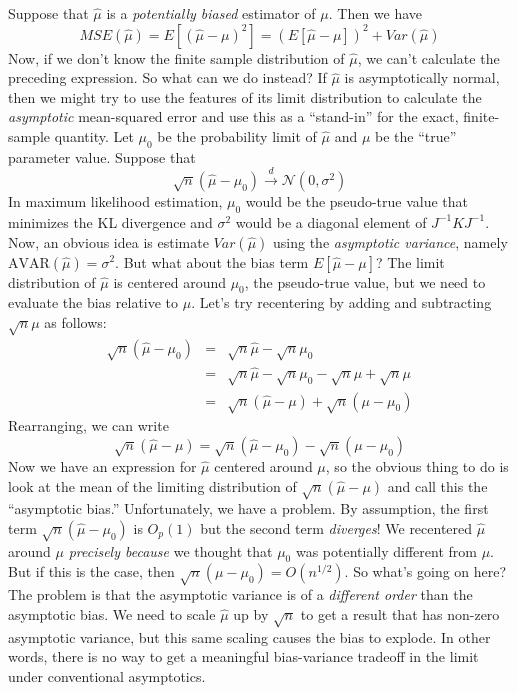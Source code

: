 Suppose that $\widehat{\mu}$ is a \emph{potentially biased} estimator of $\mu$. 
Then we have
$$MSE(\widehat{\mu}) = E[(\widehat{\mu} - \mu)^2] = \left(E[\widehat{\mu} - \mu]\right)^2 + Var(\widehat{\mu})$$
Now, if we don't know the finite sample distribution of $\widehat{\mu}$, we can't calculate the preceding expression. 
So what can we do instead? If $\widehat{\mu}$ is asymptotically normal, then we might try to use the features of its limit distribution to calculate the \emph{asymptotic} mean-squared error and use this as a ``stand-in'' for the exact, finite-sample quantity. 
Let $\mu_0$ be the probability limit of $\widehat{\mu}$ and $\mu$ be the ``true'' parameter value.
Suppose that
$$\sqrt{n}\left(\widehat{\mu} - \mu_0 \right) \overset{d}{\rightarrow} \mathcal{N}(0,\sigma^2)$$
In maximum likelihood estimation, $\mu_0$ would be the pseudo-true value that minimizes the KL divergence and $\sigma^2$ would be a diagonal element of $J^{-1}KJ^{-1}$. 
Now, an obvious idea is estimate $Var(\widehat{\mu})$ using the \emph{asymptotic variance}, namely $\mbox{AVAR}(\widehat{\mu}) = \sigma^2$. 
But what about the bias term $E[\widehat{\mu} - \mu]$? 
The limit distribution of $\widehat{\mu}$ is centered around $\mu_0$, the pseudo-true value, but we need to evaluate the bias relative to $\mu$.
Let's try recentering by adding and subtracting $\sqrt{n}\mu$ as follows:
\begin{eqnarray*}
\sqrt{n}\left(\widehat{\mu} - \mu_0 \right) &=& \sqrt{n}\widehat{\mu} - \sqrt{n} \mu_0\\
&=& \sqrt{n}\widehat{\mu} - \sqrt{n} \mu_0 - \sqrt{n} \mu + \sqrt{n} \mu\\
&=& \sqrt{n}\left( \widehat{\mu} - \mu\right) + \sqrt{n}\left(\mu - \mu_0 \right)
\end{eqnarray*}
Rearranging, we can write
$$\sqrt{n}\left( \widehat{\mu} - \mu\right) = \sqrt{n}\left(\widehat{\mu} - \mu_0 \right) - \sqrt{n}\left(\mu - \mu_0 \right)$$
Now we have an expression for $\widehat{\mu}$ centered around $\mu$, so the obvious thing to do is look at the mean of the limiting distribution of $\sqrt{n}\left( \widehat{\mu} - \mu\right) $ and call this the ``asymptotic bias.'' 
Unfortunately, we have a problem. By assumption, the first term $\sqrt{n}\left(\widehat{\mu} - \mu_0 \right)$ is $O_p(1)$ but the second term \emph{diverges}! 
We recentered $\widehat{\mu}$ around $\mu$ \emph{precisely because} we thought that $\mu_0$ was potentially different from $\mu$. But if this is the case, then $ \sqrt{n}\left(\mu - \mu_0 \right) = O(n^{1/2})$. 
So what's going on here? The problem is that the asymptotic variance is of a \emph{different order} than the asymptotic bias. 
We need to scale $\widehat{\mu}$ up by $\sqrt{n}$ to get a result that has non-zero asymptotic variance, but this same scaling causes the bias to explode. 
In other words, there is no way to get a meaningful bias-variance tradeoff in the limit under conventional asymptotics.

